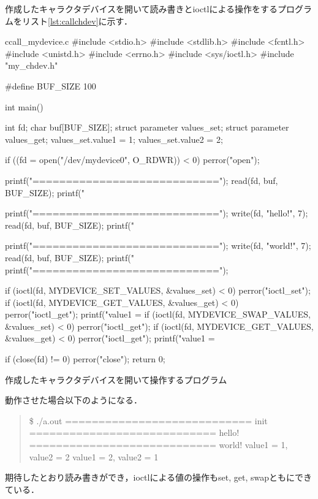 作成したキャラクタデバイスを開いて読み書きとioctlによる操作をするプログラムをリスト\ref{lst:callchdev}に示す．
\begin{longlisting}
\begin{myminted}{c}{call\_mydevice.c}
#include <stdio.h>
#include <stdlib.h>
#include <fcntl.h>
#include <unistd.h>
#include <errno.h>
#include <sys/ioctl.h>
#include "my_chdev.h"

#define BUF_SIZE 100

int main() {
    int fd;
    char buf[BUF_SIZE];
    struct parameter values_set;
    struct parameter values_get;
    values_set.value1 = 1;
    values_set.value2 = 2;

    if ((fd = open("/dev/mydevice0", O_RDWR)) < 0) perror("open");

    printf("============================\n");
    read(fd, buf, BUF_SIZE);
    printf("%

    printf("============================\n");
    write(fd, "hello!", 7);
    read(fd, buf, BUF_SIZE);
    printf("%

    printf("============================\n");
    write(fd, "world!", 7);
    read(fd, buf, BUF_SIZE);
    printf("%
    printf("============================\n");

    if (ioctl(fd, MYDEVICE_SET_VALUES, &values_set) < 0) perror("ioctl_set");
    if (ioctl(fd, MYDEVICE_GET_VALUES, &values_get) < 0) perror("ioctl_get");
    printf("value1 = %
    if (ioctl(fd, MYDEVICE_SWAP_VALUES, &values_set) < 0) perror("ioctl_get");
    if (ioctl(fd, MYDEVICE_GET_VALUES, &values_get) < 0) perror("ioctl_get");
    printf("value1 = %

    if (close(fd) != 0) perror("close");
    return 0;
}
\end{myminted}
\caption{作成したキャラクタデバイスを開いて操作するプログラム}
\label{lst:callchdev}
\end{longlisting}

動作させた場合以下のようになる．
\begin{quote}
\$ ./a.out    
============================
init
============================
hello!
============================
world!
value1 = 1, value2 = 2
value1 = 2, value2 = 1
\end{quote}

期待したとおり読み書きができ，ioctlによる値の操作もset, get, swapともにできている．

